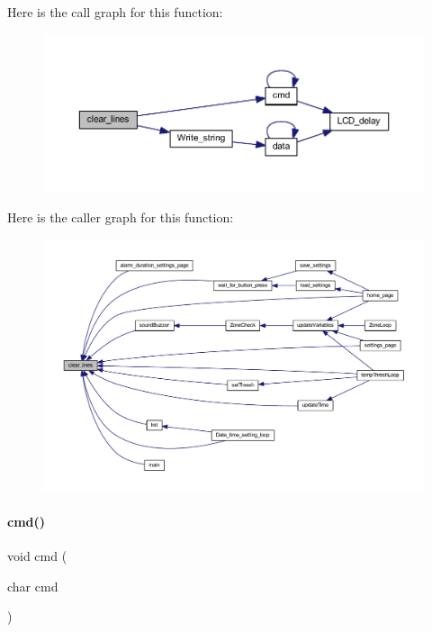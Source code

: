 Here is the call graph for this function\+:
\nopagebreak
\begin{figure}[H]
\begin{center}
\leavevmode
\includegraphics[width=350pt]{a00032_a8180985bda05d2858c1cd892c9619a42_cgraph}
\end{center}
\end{figure}
Here is the caller graph for this function\+:
\nopagebreak
\begin{figure}[H]
\begin{center}
\leavevmode
\includegraphics[width=350pt]{a00032_a8180985bda05d2858c1cd892c9619a42_icgraph}
\end{center}
\end{figure}
\mbox{\label{a00032_ac1f52f9c871ece7cb377c4fea1c6c79d}} 
\paragraph{cmd()}
{\footnotesize\ttfamily void cmd (\begin{DoxyParamCaption}\item[{char}]{cmd }\end{DoxyParamCaption})}

